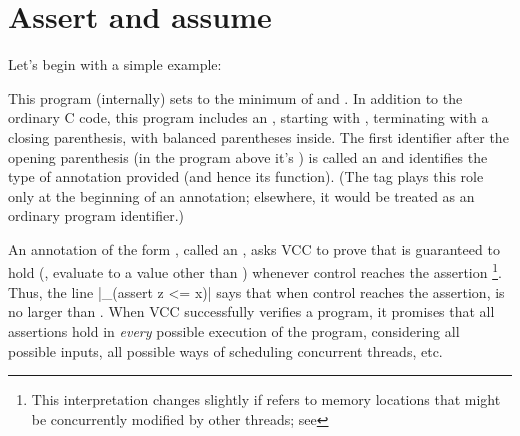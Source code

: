 \section{Assert and assume}
\label{sect:assert-assume}


Let's begin with a simple example:

This program (internally) sets  to the minimum of  and
. In addition to the ordinary C code, this program includes an
, starting with \vcc{_(}, terminating with a closing
parenthesis, with balanced parentheses inside. The first identifier
after the opening parenthesis (in the program above it's )
is called an  and
identifies the type of annotation provided (and hence its function).
(The tag plays this role only 
at the beginning of an annotation; elsewhere, it would be treated as
an ordinary program identifier.)

An annotation of the form , called an , asks VCC to prove that
 is guaranteed to hold (\ie, evaluate to a value other than )
whenever control reaches the assertion%
\footnote{
  This interpretation changes slightly if  refers to
  memory locations that might be concurrently modified by other
  threads; see }.  
Thus, the line \vcc|_(assert z <= x)| says
that when control reaches the assertion,  is no larger than .
When VCC successfully verifies a program, it promises that all assertions
hold in \emph{every} possible execution of the program, considering all possible inputs,
all possible ways of scheduling concurrent threads, etc. 

